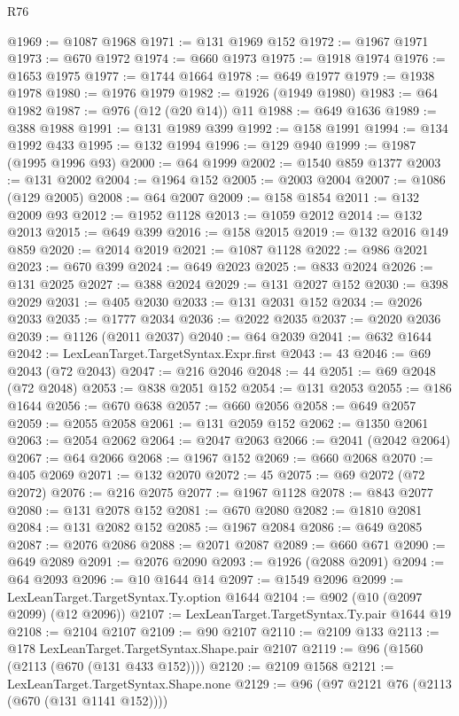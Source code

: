 \begin{lexlean}{R76}
\begin{coremodule}
@1969 := @1087 @1968
@1971 := @131 @1969 @152
@1972 := @1967 @1971
@1973 := @670 @1972
@1974 := @660 @1973
@1975 := @1918 @1974
@1976 := @1653 @1975
@1977 := @1744 @1664
@1978 := @649 @1977
@1979 := @1938 @1978
@1980 := @1976 @1979
@1982 := @1926 (@1949 @1980)
@1983 := @64 @1982
@1987 := @976 (@12 (@20 @14)) @11
@1988 := @649 @1636
@1989 := @388 @1988
@1991 := @131 @1989 @399
@1992 := @158 @1991
@1994 := @134 @1992 @433
@1995 := @132 @1994
@1996 := @129 @940
@1999 := @1987 (@1995 @1996 @93)
@2000 := @64 @1999
@2002 := @1540 @859 @1377
@2003 := @131 @2002
@2004 := @1964 @152
@2005 := @2003 @2004
@2007 := @1086 (@129 @2005)
@2008 := @64 @2007
@2009 := @158 @1854
@2011 := @132 @2009 @93
@2012 := @1952 @1128
@2013 := @1059 @2012
@2014 := @132 @2013
@2015 := @649 @399
@2016 := @158 @2015
@2019 := @132 @2016 @149 @859
@2020 := @2014 @2019
@2021 := @1087 @1128
@2022 := @986 @2021
@2023 := @670 @399
@2024 := @649 @2023
@2025 := @833 @2024
@2026 := @131 @2025
@2027 := @388 @2024
@2029 := @131 @2027 @152
@2030 := @398 @2029
@2031 := @405 @2030
@2033 := @131 @2031 @152
@2034 := @2026 @2033
@2035 := @1777 @2034
@2036 := @2022 @2035
@2037 := @2020 @2036
@2039 := @1126 (@2011 @2037)
@2040 := @64 @2039
@2041 := @632 @1644
@2042 := LexLeanTarget.TargetSyntax.Expr.first
@2043 := 43
@2046 := @69 @2043 (@72 @2043)
@2047 := @216 @2046
@2048 := 44
@2051 := @69 @2048 (@72 @2048)
@2053 := @838 @2051 @152
@2054 := @131 @2053
@2055 := @186 @1644
@2056 := @670 @638
@2057 := @660 @2056
@2058 := @649 @2057
@2059 := @2055 @2058
@2061 := @131 @2059 @152
@2062 := @1350 @2061
@2063 := @2054 @2062
@2064 := @2047 @2063
@2066 := @2041 (@2042 @2064)
@2067 := @64 @2066
@2068 := @1967 @152
@2069 := @660 @2068
@2070 := @405 @2069
@2071 := @132 @2070
@2072 := 45
@2075 := @69 @2072 (@72 @2072)
@2076 := @216 @2075
@2077 := @1967 @1128
@2078 := @843 @2077
@2080 := @131 @2078 @152
@2081 := @670 @2080
@2082 := @1810 @2081
@2084 := @131 @2082 @152
@2085 := @1967 @2084
@2086 := @649 @2085
@2087 := @2076 @2086
@2088 := @2071 @2087
@2089 := @660 @671
@2090 := @649 @2089
@2091 := @2076 @2090
@2093 := @1926 (@2088 @2091)
@2094 := @64 @2093
@2096 := @10 @1644 @14
@2097 := @1549 @2096
@2099 := LexLeanTarget.TargetSyntax.Ty.option @1644
@2104 := @902 (@10 (@2097 @2099) (@12 @2096))
@2107 := LexLeanTarget.TargetSyntax.Ty.pair @1644 @19
@2108 := @2104 @2107
@2109 := @90 @2107
@2110 := @2109 @133
@2113 := @178 LexLeanTarget.TargetSyntax.Shape.pair @2107
@2119 := @96 (@1560 (@2113 (@670 (@131 @433 @152))))
@2120 := @2109 @1568
@2121 := LexLeanTarget.TargetSyntax.Shape.none
@2129 := @96 (@97 @2121 @76 (@2113 (@670 (@131 @1141 @152))))

\end{coremodule}
\end{lexlean}
